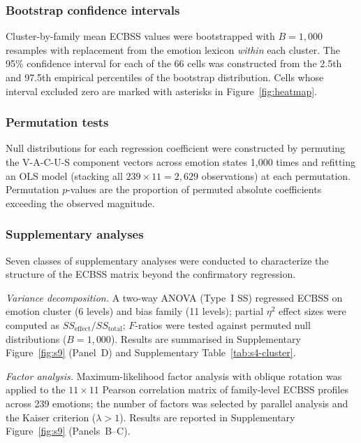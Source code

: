 \documentclass[12pt,a4paper]{article}
\newcommand{\ecbss}{\textsc{ECBSS}}
\newcommand{\vacus}{V-A-C-U-S}
\begin{document}
\subsubsection{Bootstrap confidence intervals}

Cluster-by-family mean \ecbss{} values were bootstrapped with $B = 1{,}000$ resamples with replacement from the emotion lexicon \emph{within} each cluster. The 95\% confidence interval for each of the 66 cells was constructed from the 2.5th and 97.5th empirical percentiles of the bootstrap distribution. Cells whose interval excluded zero are marked with asterisks in Figure~\ref{fig:heatmap}.

\subsubsection{Permutation tests}

Null distributions for each regression coefficient were constructed by permuting the \vacus{} component vectors across emotion states 1,000 times and refitting an OLS model (stacking all $239 \times 11 = 2{,}629$ observations) at each permutation. Permutation $p$-values are the proportion of permuted absolute coefficients exceeding the observed magnitude.

\subsubsection{Supplementary analyses}

Seven classes of supplementary analyses were conducted to characterize the structure of the \ecbss{} matrix beyond the confirmatory regression.

\emph{Variance decomposition.} A two-way ANOVA (Type~I SS) regressed \ecbss{} on emotion cluster (6 levels) and bias family (11 levels); partial $\eta^2$ effect sizes were computed as $SS_{\text{effect}} / SS_{\text{total}}$; $F$-ratios were tested against permuted null distributions ($B = 1{,}000$). Results are summarised in Supplementary Figure~\ref{fig:s9} (Panel~D) and Supplementary Table~\ref{tab:s4-cluster}.

\emph{Factor analysis.} Maximum-likelihood factor analysis with oblique rotation was applied to the $11 \times 11$ Pearson correlation matrix of family-level \ecbss{} profiles across 239 emotions; the number of factors was selected by parallel analysis and the Kaiser criterion ($\lambda > 1$). Results are reported in Supplementary Figure~\ref{fig:s9} (Panels~B--C).
\end{document}
